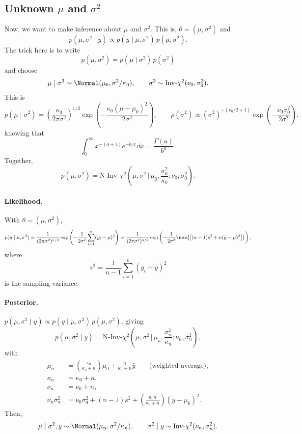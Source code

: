 \subsection{Unknown $\mu$ and $\sigma^2$}
Now, we want to make inference about $\mu$ and $\sigma^2$. This is, $\theta = (\mu, \sigma^2)$ and
\[
p(\mu, \sigma^2 \mid y) \propto p(y \mid \mu, \sigma^2)\,p(\mu, \sigma^2).
\]
The trick here is to write
\[
p(\mu, \sigma^2) = p(\mu \mid \sigma^2)\,p(\sigma^2)
\]
and choose
\[
\mu \mid \sigma^2 \sim \Normal(\mu_0, \sigma^2/\kappa_0), \qquad \sigma^2 \sim \text{Inv-}\chi^2(\nu_0, \sigma_0^2).
\]
This is
\[
p(\mu \mid \sigma^2) = \left(\frac{\kappa_0}{2\pi\sigma^2}\right)^{1/2}\exp\left(-\frac{\kappa_0(\mu - \mu_0)^2}{2\sigma^2}\right),
\qquad
p(\sigma^2) \propto (\sigma^2)^{-(\nu_0/2 + 1)}\exp\left(-\frac{\nu_0\sigma_0^2}{2\sigma^2}\right),
\]
knowing that
\[
\int_0^\infty x^{-(a+1)}e^{-b/x}\dd x = \frac{\Gamma(a)}{b^a}.
\]
Together,
\[
p(\mu, \sigma^2) = \text{N-Inv-}\chi^2\left(\mu, \sigma^2 \,\Big|\, \mu_0, \frac{\sigma_0^2}{\kappa_0}; \nu_0, \sigma_0^2\right).
\]

\paragraph{Likelihood.} With $\theta = (\mu, \sigma^2)$,
\[
p(y \mid \mu, \sigma^2) = \frac{1}{(2\pi\sigma^2)^{n/2}}\exp\left(-\frac{1}{2\sigma^2}\sum_{i=1}^{n}(y_i - \mu)^2\right)
= \frac{1}{(2\pi\sigma^2)^{n/2}}\exp\left(-\frac{1}{2\sigma^2}\new{\left[(n-1)s^2 + n(\bar y - \mu)^2\right]}\right),
\]
where
\[
s^2 = \frac{1}{n-1}\sum_{i=1}^{n}(y_i - \bar y)^2
\]
is the sampling variance.

\paragraph{Posterior.} $p(\mu, \sigma^2 \mid y) \propto p(y \mid \mu, \sigma^2)\,p(\mu, \sigma^2)$, giving
\[
p(\mu, \sigma^2 \mid y) = \text{N-Inv-}\chi^2\left(\mu, \sigma^2 \,\Big|\, \mu_n, \frac{\sigma_n^2}{\kappa_n}; \nu_n, \sigma_n^2\right),
\]
with
\begin{align*}
\mu_n &= \left(\frac{\kappa_0}{\kappa_0 + n}\right)\mu_0 + \frac{n}{\kappa_0 + n}\bar y \qquad\text{(weighted average)},\\
\kappa_n &= \kappa_0 + n,\\
\nu_n &= \nu_0 + n,\\
\nu_n\sigma_n^2 &= \nu_0\sigma_0^2 + (n-1)s^2 + \left(\frac{\kappa_0 n}{\kappa_0 + n}\right)(\bar y - \mu_0)^2.
\end{align*}
Then,
\[
\mu \mid \sigma^2, y \sim \Normal(\mu_n, \sigma^2/\kappa_n), \qquad \sigma^2 \mid y \sim \text{Inv-}\chi^2(\nu_n, \sigma_n^2).
\]

